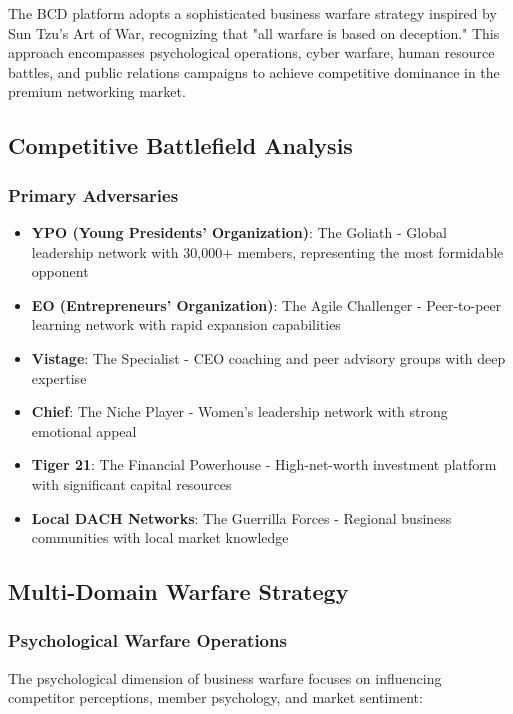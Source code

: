 The BCD platform adopts a sophisticated business warfare strategy inspired by Sun Tzu's Art of War, recognizing that "all warfare is based on deception." This approach encompasses psychological operations, cyber warfare, human resource battles, and public relations campaigns to achieve competitive dominance in the premium networking market.

\subsection{Competitive Battlefield Analysis}

\subsubsection{Primary Adversaries}
\begin{itemize}
    \item \textbf{YPO (Young Presidents' Organization)}: The Goliath - Global leadership network with 30,000+ members, representing the most formidable opponent
    \item \textbf{EO (Entrepreneurs' Organization)}: The Agile Challenger - Peer-to-peer learning network with rapid expansion capabilities
    \item \textbf{Vistage}: The Specialist - CEO coaching and peer advisory groups with deep expertise
    \item \textbf{Chief}: The Niche Player - Women's leadership network with strong emotional appeal
    \item \textbf{Tiger 21}: The Financial Powerhouse - High-net-worth investment platform with significant capital resources
    \item \textbf{Local DACH Networks}: The Guerrilla Forces - Regional business communities with local market knowledge
\end{itemize}

\subsection{Multi-Domain Warfare Strategy}

\subsubsection{Psychological Warfare Operations}

The psychological dimension of business warfare focuses on influencing competitor perceptions, member psychology, and market sentiment:

